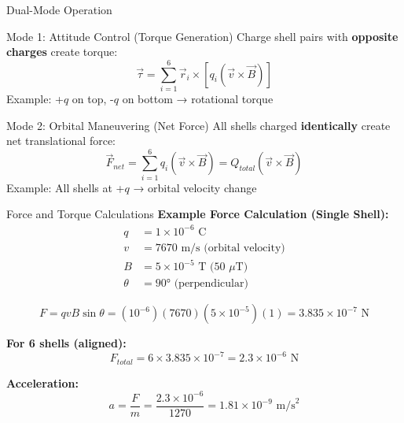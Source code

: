 \documentclass[aspectratio=169]{beamer}
\begin{document}
\begin{frame}{Dual-Mode Operation}
\begin{block}{Mode 1: Attitude Control (Torque Generation)}
Charge shell pairs with \textbf{opposite charges} create torque:
\begin{equation}
\vec{\tau} = \sum_{i=1}^{6} \vec{r}_i \times [q_i(\vec{v} \times \vec{B})]
\end{equation}
Example: +$q$ on top, -$q$ on bottom → rotational torque
\end{block}

\begin{block}{Mode 2: Orbital Maneuvering (Net Force)}
All shells charged \textbf{identically} create net translational force:
\begin{equation}
\vec{F}_{net} = \sum_{i=1}^{6} q_i(\vec{v} \times \vec{B}) = Q_{total}(\vec{v} \times \vec{B})
\end{equation}
Example: All shells at +$q$ → orbital velocity change
\end{block}
\end{frame}

\begin{frame}{Force and Torque Calculations}
\textbf{Example Force Calculation (Single Shell):}
\begin{align*}
q &= 1 \times 10^{-6} \text{ C} \\
v &= 7670 \text{ m/s (orbital velocity)} \\
B &= 5 \times 10^{-5} \text{ T (50 } \mu\text{T)} \\
\theta &= 90° \text{ (perpendicular)}
\end{align*}

\begin{equation}
F = qvB\sin\theta = (10^{-6})(7670)(5 \times 10^{-5})(1) = 3.835 \times 10^{-7} \text{ N}
\end{equation}

\textbf{For 6 shells (aligned):}
\begin{equation}
F_{total} = 6 \times 3.835 \times 10^{-7} = 2.3 \times 10^{-6} \text{ N}
\end{equation}

\textbf{Acceleration:}
\begin{equation}
a = \frac{F}{m} = \frac{2.3 \times 10^{-6}}{1270} = 1.81 \times 10^{-9} \text{ m/s}^2
\end{equation}
\end{frame}
\end{document}
